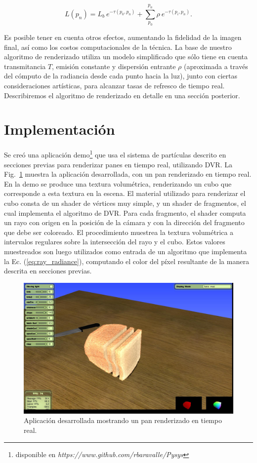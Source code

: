 \begin{equation} \label{eq:ray_radiance}  
  L(p_n) = L_b \ e^{-\tau(p_0, p_n)} + \sum_{p_0}^{p_n} \rho \ e^{-\tau(p_i,p_n)}.
\end{equation}

Es posible tener en cuenta otros efectos, aumentando la fidelidad de la imagen final, así como los costos computacionales de la técnica.
La base de nuestro algoritmo de renderizado utiliza un modelo simplificado que sólo tiene en cuenta transmitancia $T$, emisión constante y dispersión entrante $\rho$ (aproximada a través del cómputo de la radiancia desde cada punto hacia la luz), junto con ciertas consideraciones artísticas, para alcanzar tasas de refresco de tiempo real.
Describiremos el algoritmo de renderizado en detalle en una sección posterior.

\section{Implementación}

Se creó una aplicación demo\footnote{disponible en \emph{https://www.github.com/rbaravalle/Pysys}}  que usa el sistema de partículas descrito en secciones previas para renderizar panes en tiempo real, utilizando DVR.
La Fig.~\ref{fg:application} muestra la aplicación desarrollada, con un pan renderizado en tiempo real.
En la demo se produce una textura volumétrica, renderizando un cubo que corresponde a esta textura en la escena.
El material utilizado para renderizar el cubo consta de un shader de vértices muy simple, y un shader de fragmentos, el cual implementa el algoritmo de DVR.
Para cada fragmento, el shader computa un rayo con origen en la posición de la cámara y con la dirección del fragmento que debe ser coloreado.
El procedimiento muestrea la textura volumétrica a intervalos regulares sobre la intersección del rayo y el cubo.
Estos valores muestreados son luego utilizados como entrada de un algoritmo que implementa la Ec. (\ref{eq:ray_radiance}), computando el color del píxel resultante de la manera descrita en secciones previas.



\begin{figure}
\centerline{\includegraphics[width=13cm]{figures/application}}
\caption{Aplicación desarrollada mostrando un pan renderizado en tiempo real.}
\label{fg:application}
\end{figure}


